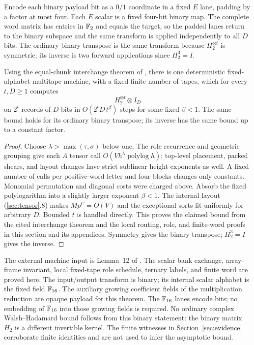 Encode each binary payload bit as a $0/1$ coordinate in a fixed $E$ lane, padding by a factor at most four. Each $E$ scalar is a fixed four-bit binary map. The complete word matrix has entries in $\mathbb F_2$ and equals the target, so the padded lanes return to the binary subspace and the same transform is applied independently to all $D$ bits. The ordinary binary transpose is the same transform because $H_2^{\otimes t}$ is symmetric; its inverse is two forward applications since $H_2^3=I$.

\begin{theorem}\label{thm:tensor}
Using the equal-chunk interchange theorem of \cite[Lemma~12]{OpenAI26}, there is one deterministic fixed-alphabet multitape machine, with a fixed finite number of tapes, which for every $t,D\ge1$ computes
\[
 H_2^{\otimes t}\otimes I_D
\]
on $2^t$ records of $D$ bits in $O(2^tD\,t^\beta)$ steps for some fixed $\beta<1$. The same bound holds for its ordinary binary transpose; its inverse has the same bound up to a constant factor.
\end{theorem}

\begin{proof}
Choose $\lambda>\max(\tau,\sigma)$ below one. The role recurrence and geometric grouping give each $A$ tensor call $O(Vh^\lambda\operatorname{polylog}h)$; top-level placement, packed shears, and layout changes have strict sublinear height exponents as well. A fixed number of calls per positive-word letter and four blocks changes only constants. Monomial permutation and diagonal costs were charged above. Absorb the fixed polylogarithm into a slightly larger exponent $\beta<1$. The internal layout (\ref{sec:tensor}.8) makes $Mp^C=O(V)$ and the exceptional sorts fit uniformly for arbitrary $D$. Bounded $t$ is handled directly. This proves the claimed bound from the cited interchange theorem and the local routing, role, and finite-word proofs in this section and its appendices. Symmetry gives the binary transpose; $H_2^3=I$ gives the inverse.\end{proof}

\begin{remark}
The external machine input is Lemma~12 of \cite{OpenAI26}. The scalar bank exchange, array-frame invariant, local fixed-tape role schedule, ternary labels, and finite word are proved here. The input/output transform is binary; its internal scalar alphabet is the fixed field $\mathbb F_{16}$. The auxiliary growing coefficient fields of the multiplication reduction are opaque payload for this theorem. The $\mathbb F_{16}$ lanes encode bits; no embedding of $\mathbb F_{16}$ into those growing fields is required. No ordinary complex Walsh--Hadamard bound follows from this binary statement: the binary matrix $H_2$ is a different invertible kernel. The finite witnesses in Section~\ref{sec:evidence} corroborate finite identities and are not used to infer the asymptotic bound.
\end{remark}

